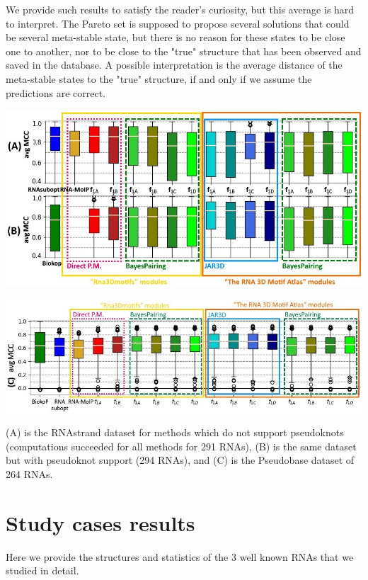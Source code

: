 \documentclass{article}
\begin{document}
We provide such results to satisfy the reader's curiosity, but this average is hard to interpret. 
The Pareto set is supposed to propose several solutions that could be several meta-stable state, but there is no reason for these states to be close one to another, nor to be close to the "true" structure that has been observed and saved in the database.
A possible interpretation is the average distance of the meta-stable states to the "true" structure, if and only if we assume the predictions are correct.

\hspace{-1cm}
\includegraphics[width=\textwidth]{fig/Benchmark_avg.jpg}

\hspace{-1cm}
\includegraphics[width=1.05\textwidth]{fig/pseudobase_avg.jpg}

(A) is the RNAstrand dataset for methods which do not support pseudoknots (computations succeeded for all methods for 291 RNAs), (B) is the same dataset but with pseudoknot support (294 RNAs), and (C) is the Pseudobase dataset of 264 RNAs.

\section{Study cases results}
Here we provide the structures and statistics of the 3 well known RNAs that we studied in detail.
\end{document}

